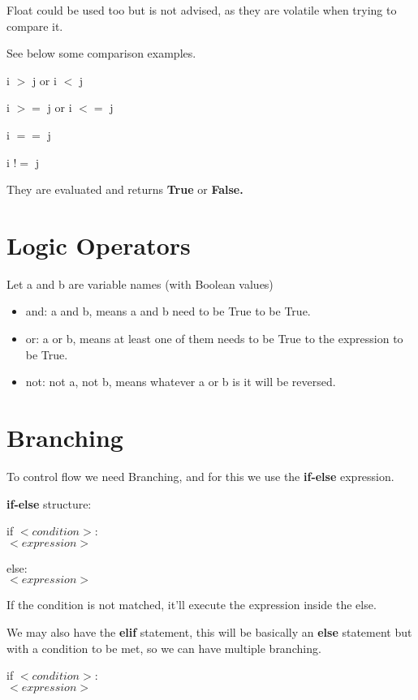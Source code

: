 \documentclass{article}
\begin{document}
\noindent
Float could be used too but is not advised, as they are volatile when trying to compare it.

See below some comparison examples.

i $>$ j or i $<$ j

i $>=$ j or i $<=$ j

i $==$ j

i $!=$ j

They are evaluated and returns \textbf{True} or \textbf{False.}

\section{Logic Operators}
Let a and b are variable names (with Boolean values)

\begin{itemize}
    \item and: a and b, means a and b need to be True to be True.
    \item or: a or b, means at least one of them needs to be True to the expression to be True.
    \item not: not a, not b, means whatever a or b is it will be reversed.
\end{itemize}

\newpage
\pagestyle{headings}

\section{Branching}
To control flow we need Branching, and for this
we use the \textbf{if-else} expression.

\textbf{if-else} structure:

if $<condition>$:\\
    \hspace*{0.85cm}$<expression>$

else:\\
    \hspace*{0.85cm}$<expression>$

\noindent
If the condition is not matched, it'll execute
the expression inside the else.

We may also have the \textbf{elif} statement,
this will be basically an \textbf{else} statement but 
with a condition to be met, so we can have multiple
branching.

if $<condition>$:\\
    \hspace*{0.85cm}$<expression>$
\end{document}

